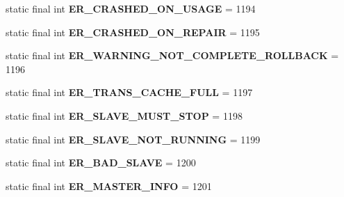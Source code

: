 \begin{DoxyCompactItemize}
static final int {\bfseries E\+R\+\_\+\+C\+R\+A\+S\+H\+E\+D\+\_\+\+O\+N\+\_\+\+U\+S\+A\+GE} = 1194
\item 
\mbox{\label{classcom_1_1mysql_1_1cj_1_1exceptions_1_1_mysql_error_numbers_a7944f70534cadf208504d1dd2af5c0ce}} 
static final int {\bfseries E\+R\+\_\+\+C\+R\+A\+S\+H\+E\+D\+\_\+\+O\+N\+\_\+\+R\+E\+P\+A\+IR} = 1195
\item 
\mbox{\label{classcom_1_1mysql_1_1cj_1_1exceptions_1_1_mysql_error_numbers_aa9e60c5ebb871898ca2187d49df07d4b}} 
static final int {\bfseries E\+R\+\_\+\+W\+A\+R\+N\+I\+N\+G\+\_\+\+N\+O\+T\+\_\+\+C\+O\+M\+P\+L\+E\+T\+E\+\_\+\+R\+O\+L\+L\+B\+A\+CK} = 1196
\item 
\mbox{\label{classcom_1_1mysql_1_1cj_1_1exceptions_1_1_mysql_error_numbers_aba22ff64322d54c467e5916313c4dd1f}} 
static final int {\bfseries E\+R\+\_\+\+T\+R\+A\+N\+S\+\_\+\+C\+A\+C\+H\+E\+\_\+\+F\+U\+LL} = 1197
\item 
\mbox{\label{classcom_1_1mysql_1_1cj_1_1exceptions_1_1_mysql_error_numbers_ab9dd71e9f5084be84055e7b86583374f}} 
static final int {\bfseries E\+R\+\_\+\+S\+L\+A\+V\+E\+\_\+\+M\+U\+S\+T\+\_\+\+S\+T\+OP} = 1198
\item 
\mbox{\label{classcom_1_1mysql_1_1cj_1_1exceptions_1_1_mysql_error_numbers_ada3cffd15f3c04ea06f5567181ee9e34}} 
static final int {\bfseries E\+R\+\_\+\+S\+L\+A\+V\+E\+\_\+\+N\+O\+T\+\_\+\+R\+U\+N\+N\+I\+NG} = 1199
\item 
\mbox{\label{classcom_1_1mysql_1_1cj_1_1exceptions_1_1_mysql_error_numbers_a9e97dea6abfab514358e2800ce2c500a}} 
static final int {\bfseries E\+R\+\_\+\+B\+A\+D\+\_\+\+S\+L\+A\+VE} = 1200
\item 
\mbox{\label{classcom_1_1mysql_1_1cj_1_1exceptions_1_1_mysql_error_numbers_a62e45c3307cb80533de3beb7ad0c7375}} 
static final int {\bfseries E\+R\+\_\+\+M\+A\+S\+T\+E\+R\+\_\+\+I\+N\+FO} = 1201

\end{DoxyCompactItemize}
